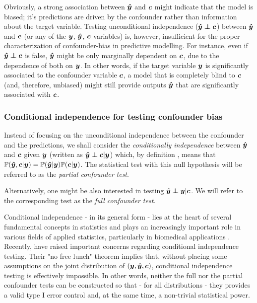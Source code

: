 \documentclass{article}
\begin{document}
Obviously, a strong association between $\boldsymbol{\hat{y}}$ and $\boldsymbol{c}$ might indicate that the model is biased; it's predictions are driven by the confounder rather than information about the target variable.
Testing unconditional independence ($\yhat \independent \c$) between $\boldsymbol{\hat{y}}$ and $\boldsymbol{c}$ (or any of the $\boldsymbol{y}$, $\boldsymbol{\hat{y}}$, $\boldsymbol{c}$ variables) is, however, insufficient for the proper characterization of confounder-bias in predictive modelling.
For instance, even if $\yhat \independent \c$ is false, $\boldsymbol{\hat{y}}$ might be only marginally dependent on $\boldsymbol{c}$, due to the dependence of both on $\boldsymbol{y}$. In other words, if the target variable $\boldsymbol{y}$ is significantly associated to the confounder variable $\boldsymbol{c}$, a model that is completely blind to $\boldsymbol{c}$ (and, therefore, unbiased) might still provide outputs $\boldsymbol{\hat{y}}$ that are significantly associated with $\boldsymbol{c}$.

\subsubsection*{Conditional independence for testing confounder bias}

Instead of focusing on the unconditional independence between the confounder and the predictions, we shall consider the \emph{conditionally independence} between $\boldsymbol{\hat{y}}$ and $\boldsymbol{c}$ given $\boldsymbol{y}$ (written as $\yhat \independent \c | \y$) which, by definition  \citep{dawid1979conditional}, means that $\mathbb{P}(\boldsymbol{\hat{y}}, \boldsymbol{c}|\boldsymbol{y}) = \mathbb{P}(\boldsymbol{\hat{y}}|\boldsymbol{y})\mathbb{P}(\boldsymbol{c}|\boldsymbol{y})$. The statistical test with this null hypothesis will be referred to as the \emph{partial confounder test}.

Alternatively, one might be also interested in testing $\yhat \independent \y | \c$. We will refer to the corresponding test as the \emph{full confounder test}.

 Conditional independence - in its general form - lies at the heart of several fundamental concepts in statistics and  plays an increasingly important role in various fields of applied statistics, particularly in biomedical applications \citep{spirtes2000causation, peters2016causal, fiedler2011mediation, candes2016panning}. Recently, \cite{shah2020hardness} have raised important concerns regarding conditional independence testing.
 Their "no free lunch" theorem implies that, without placing some assumptions on the joint distribution of $(\boldsymbol{y}, \boldsymbol{\hat{y}}, \boldsymbol{c})$, conditional independence testing is effectively impossible. In other words, neither the full nor the partial confounder tests can be constructed so that - for all distributions - they provides a valid type I error control and, at the same time, a non-trivial statistical power.
\end{document}
